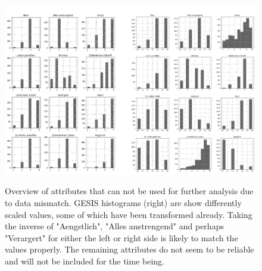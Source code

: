 \begin{figure}[ht]
	\begin{center}
		\includegraphics[scale=0.62,angle=0]{fig/histo}
		\label{std}
		\caption{Overview of attributes that can not be used for further analysis due to data mismatch. GESIS histograms (right) are show differently scaled values, some of which have been transformed already. Taking the inverse of "Aengstlich", "Alles anstrengend" and perhaps "Verargert" for either the left or right side is likely to match the values properly. The remaining attributes do not seem to be reliable and will not be included for the time being.}
	\end{center}
\end{figure}



